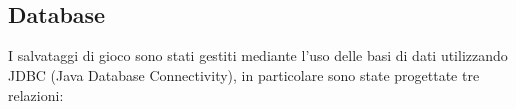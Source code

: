 \documentclass[italian,12pt,a4paper]{article}
\begin{document}
	
	\begin{figure}
		\centering
		\\
		\\
		\label{fig:immagini}
	\end{figure}
	
	\subsection{Database}
	
	I salvataggi di gioco sono stati gestiti mediante l'uso delle basi di dati utilizzando JDBC (Java Database Connectivity), in particolare sono state progettate tre relazioni:
	
\end{document}
